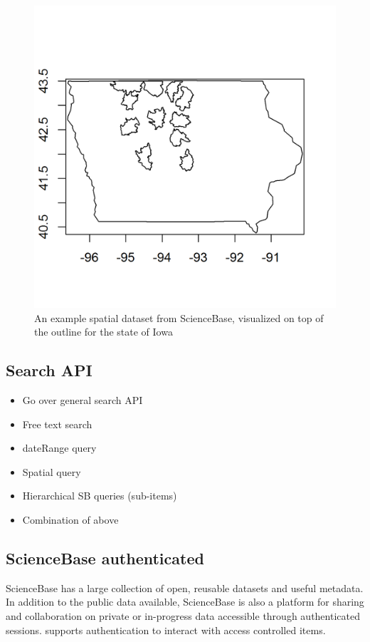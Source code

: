  \begin{figure}[htbp]
   \centering
   \includegraphics{mapfig}
   \caption{An example spatial dataset from ScienceBase, 
   visualized on top of the outline for the state of Iowa}
   \label{figure:iowafig}
 \end{figure}


\subsection{Search API}
\begin{itemize}
	\item{Go over general search API}
	\item{Free text search}
	\item{dateRange query}
	\item{Spatial query}
	\item{Hierarchical SB queries (sub-items)}
	\item{Combination of above}
\end{itemize}

\subsection{ScienceBase authenticated}
ScienceBase has a large collection of open, reusable datasets and 
useful metadata. In addition to the public data available, ScienceBase
is also a platform for sharing and collaboration on private or in-progress 
data accessible through authenticated sessions.  supports 
authentication to interact with access controlled items.

